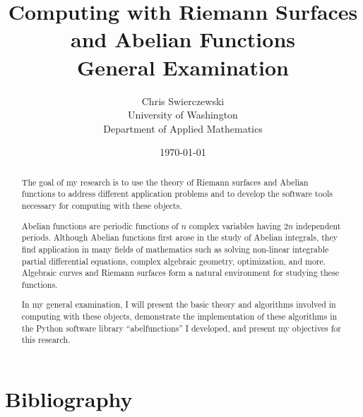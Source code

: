 \documentclass[10pt,twoside]{article}
\title{Computing with Riemann Surfaces and Abelian Functions \\ {\small
    General Examination}}
\author{
Chris Swierczewski\\
University of Washington\\
Department of Applied Mathematics}
\date{\today}
\theoremstyle{plain}
\theoremstyle{definition}
\numberwithin{equation}{section}
\numberwithin{figure}{section}
\begin{document}

\maketitle

\begin{abstract}
The goal of my research is to use the theory of Riemann surfaces and
Abelian functions to address different application problems and to
develop the software tools necessary for computing with these objects.

Abelian functions are periodic functions of $n$ complex variables having
$2n$ independent periods. Although Abelian functions first arose in the
study of Abelian integrals, they find application in many fields of
mathematics such as solving non-linear integrable partial differential
equations, complex algebraic geometry, optimization, and more. Algebraic
curves and Riemann surfaces form a natural environment for studying
these functions.

In my general examination, I will present the basic theory and
algorithms involved in computing with these objects, demonstrate the
implementation of these algorithms in the Python software library
``abelfunctions'' I developed, and present my objectives for this
research.
\end{abstract}

%
%
%


\section{Bibliography}






\end{document}
